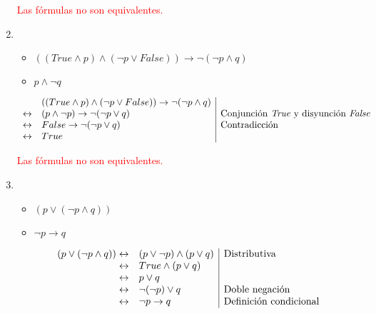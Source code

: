 \begin{enumerate}[label=\alph*)]
          \textcolor{red}{Las fórmulas no son equivalentes.}

    \item \begin{itemize}
              \item $((True \land p) \land (\neg p \lor False)) \to \neg(\neg p \land q)$
              \item $p \land \neg q$
          \end{itemize}

          \[
              \begin{array}{rl|l}
                       & ((True \land p) \land (\neg p \lor False)) \to \neg(\neg p \land q)                                                               \\
                  \leftrightarrow & (p \land \neg p) \to \neg (\neg p \lor q)                           & \text{Conjunción \textit{True} y disyunción \textit{False}} \\
                  \leftrightarrow & False \to \neg (\neg p \lor q)                                      & \text{Contradicción}                                        \\
                  \leftrightarrow & True
              \end{array}
          \]


          \textcolor{red}{Las fórmulas no son equivalentes.}

    \item \begin{itemize}
              \item $(p \lor (\neg p \land q))$
              \item $\neg p \to q$
          \end{itemize}

          \[
              \begin{array}{rl|l}
                  (p \lor (\neg p \land q)) \leftrightarrow & (p \lor \neg p) \land (p \lor q) & \text{Distributiva}           \\
                  \leftrightarrow                           & True \land (p \lor q)                                            \\
                  \leftrightarrow                           & p \lor q                                                         \\
                  \leftrightarrow                           & \neg(\neg p) \lor q              & \text{Doble negación}         \\
                  \leftrightarrow                           & \neg p \to q                     & \text{Definición condicional}
              \end{array}
          \]


\end{enumerate}
